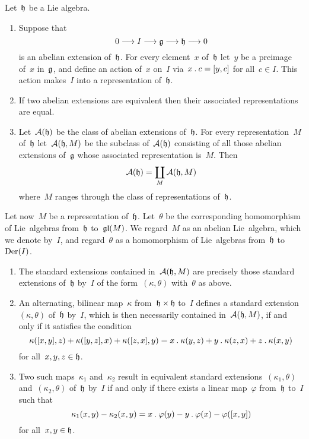 \begin{theorem}
  \label{structure of abelian extensions}
  Let~$\mathfrak{h}$ be a Lie algebra.
  \begin{enumerate}
    \item
      Suppose that
      \[
        0
        \to
        I
        \to
        \glie
        \to
        \hlie
        \to
        0
      \]
      is an abelian extension of~$\mathfrak{h}$.
      For every element~$x$ of~$\mathfrak{h}$ let~$y$ be a preimage of~$x$ in~$\mathfrak{g}$, and define an action of~$x$ on~$I$ via~$x \mathbin{.} c = [y,c]$ for all~$c \in I$.
      This action makes~$I$ into a representation of~$\mathfrak{h}$.
    \item
      If two abelian extensions are equivalent then their associated representations are equal.
    \item
      Let~$\mathcal{A}(\mathfrak{h})$ be the class of abelian extensions of~$\mathfrak{h}$.
      For every representation~$M$ of~$\mathfrak{h}$ let~$\mathcal{A}(\mathfrak{h}, M)$ be the subclass of~$\mathcal{A}(\mathfrak{h})$ consisting of all those abelian extensions of~$\mathfrak{g}$ whose associated representation is~$M$.
      Then
      \[
        \mathcal{A}(\mathfrak{h})
        =
        \coprod_M \mathcal{A}(\mathfrak{h}, M)
      \]
      where~$M$ ranges through the class of representations of~$\mathfrak{h}$.
  \end{enumerate}
  Let now~$M$ be a representation of~$\mathfrak{h}$.
  Let~$\theta$ be the corresponding homomorphism of Lie~algebras from~$\mathfrak{h}$ to~$\mathfrak{gl}(M)$.
  We regard~$M$ as an abelian Lie~algebra, which we denote by~$I$, and regard~$\theta$ as a homomorphism of Lie~algebras from~$\mathfrak{h}$ to~$\operatorname{Der}(I)$.
  \begin{enumerate}[resume*]
    \item
      The standard extensions contained in~$\mathcal{A}(\mathfrak{h}, M)$ are precisely those standard extensions of~$\mathfrak{h}$ by~$I$ of the form~$(\kappa, \theta)$ with~$\theta$ as above.
    \item
      An alternating, bilinear map~$\kappa$ from~$\mathfrak{h} \times \mathfrak{h}$ to~$I$ defines a standard extension~$(\kappa, \theta)$ of~$\mathfrak{h}$ by~$I$, which is then necessarily contained in~$\mathcal{A}(\mathfrak{h}, M)$, if and only if it satisfies the condition
      \[
        \kappa( [x,y], z ) + \kappa( [y,z], x ) + \kappa( [z,x], y )
        =
        x \mathbin{.} \kappa(y,z) + y \mathbin{.} \kappa(z,x) + z \mathbin{.} \kappa(x,y)
      \]
      for all~$x, y, z \in \mathfrak{h}$.
    \item
      Two such maps~$\kappa_1$ and~$\kappa_2$ result in equivalent standard extensions~$(\kappa_1, \theta)$ and~$(\kappa_2, \theta)$ of~$\mathfrak{h}$ by~$I$ if and only if there exists a linear map~$\varphi$ from~$\mathfrak{h}$ to~$I$ such that
      \[
        \kappa_1(x,y)
        - \kappa_2(x,y)
        =
        x \mathbin{.} \varphi(y)
        - y \mathbin{.} \varphi(x)
        - \varphi( [x,y] )
      \]
      for all~$x, y \in \mathfrak{h}$.
  \end{enumerate}
\end{theorem}


